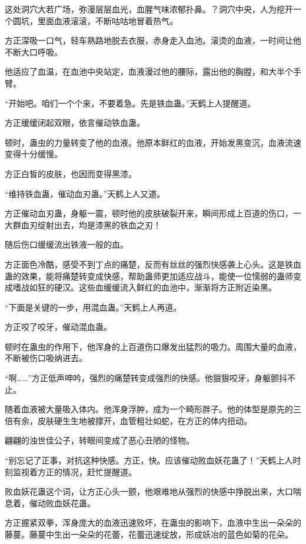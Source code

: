 
\begin{this_body}

这处洞穴大若广场，弥漫层层血光，血腥气味浓郁扑鼻。？洞穴中央，人为挖开一个圆坑，里面血液滚滚，不断咕咕地冒着热气。

方正深吸一口气，轻车熟路地脱去衣服，赤身走入血池。滚烫的血液，一时间让他不断大口呼吸。

他适应了血温，在血池中央站定，血液漫过他的腰际，露出他的胸膛，和大半个手臂。

“开始吧。咱们一个个来，不要着急。先是铁血蛊。”天鹤上人提醒道。

方正缓缓闭起双眼，依言催动铁血蛊。

顿时，蛊虫的力量转变了他的血液。他原本鲜红的血液，开始发黑变沉，血液流速变得十分缓慢。

方正白皙的皮肤，也因而变得黑漆。

“维持铁血蛊，催动血刃蛊。”天鹤上人又道。

方正催动血刃蛊，身躯一震，顿时他的皮肤破裂开来，瞬间形成上百道的伤口，一大群血刃绽射出去，均是漆黑的铁血之刃！

随后伤口缓缓流出铁液一般的血。

方正面色冷酷，感受不到丁点的痛楚，反而有丝丝的强烈快感袭上心头。这是铁血蛊的效果，能将痛楚转变成快感，帮助蛊师更加适应战斗，能使一位懦弱的蛊师变成嗜战如狂的硬汉。这些血缓缓流入鲜红的血池中，渐渐将方正附近染黑。

“下面是关键的一步，用混血蛊。”天鹤上人再道。

方正咬了咬牙，催动混血蛊。

顿时在蛊虫的作用下，他浑身的上百道伤口爆发出猛烈的吸力。周围大量的血液，不断被伤口吸纳进去。

“啊……”方正低声呻吟，强烈的痛楚转变成强烈的快感。他狠狠咬牙，身躯颤抖不止。

随着血液被大量吸入体内。他浑身浮肿，成为一个畸形胖子。他的体型是原先的三倍有余，皮肤硬生生地被撑开，血管粗壮如蛇，在方正的体内扭动。

翩翩的浊世佳公子，转眼间变成了恶心丑陋的怪物。

“别忘记了正事，对抗这种快感。方正，快。应该催动败血妖花蛊了！”天鹤上人时刻监视着方正的情况，赶忙提醒道。

败血妖花蛊这个词，让方正心头一颤，他艰难地从强烈的快感中挣脱出来，大口喘息着，催动败血妖花蛊。

方正握紧双拳，浑身庞大的血液迅速败坏，在蛊虫的影响下，血液中生出一朵朵的藤蔓。藤蔓中生出一朵朵的花蕾，花蕾迅速绽放，形成妖冶的蓝色如菊的花朵。


\end{this_body}
